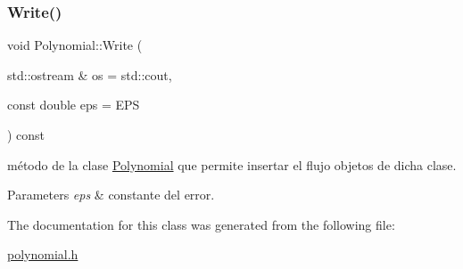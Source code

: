 \subsubsection{\texorpdfstring{Write()}{Write()}}
{\footnotesize\ttfamily void Polynomial\+::\+Write (\begin{DoxyParamCaption}\item[{std\+::ostream \&}]{os = {\ttfamily std\+:\+:cout},  }\item[{const double}]{eps = {\ttfamily EPS} }\end{DoxyParamCaption}) const}



método de la clase \hyperlink{classPolynomial}{Polynomial} que permite insertar el flujo objetos de dicha clase. 


\begin{DoxyParams}{Parameters}
{\em eps} & constante del error. \\
\hline
\end{DoxyParams}


The documentation for this class was generated from the following file\+:\begin{DoxyCompactItemize}
\item 
\hyperlink{polynomial_8h}{polynomial.\+h}\end{DoxyCompactItemize}
